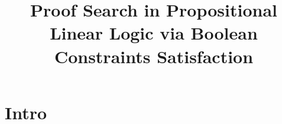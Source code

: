 \documentclass[a4paper, 12pt, english]{report}
\title{Proof Search in Propositional Linear Logic via Boolean Constraints Satisfaction
}
\begin{document}
\maketitle
\newpage
\tableofcontents
\newpage

\chapter{Intro}
% 
% 
% 
% 
\end{document}
